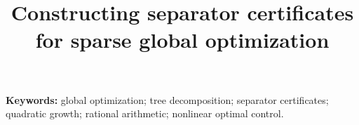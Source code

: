 \documentclass[11pt]{article}
\title{Constructing separator certificates for sparse global optimization}
\author{}
\date{}
\begin{document}
\maketitle

\noindent\textbf{Keywords:} global optimization; tree decomposition;
separator certificates; quadratic growth; rational arithmetic;
nonlinear optimal control.










\appendix




\end{document}
